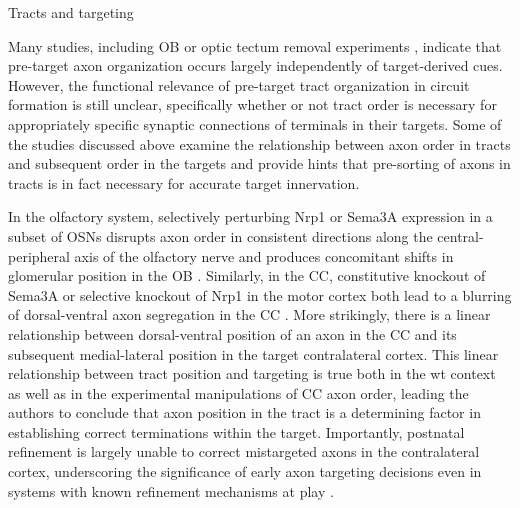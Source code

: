Tracts and targeting 

Many studies, including OB \cite{stjohn2003sorting} or optic tectum removal experiments \cite{reh1983organization}, indicate that pre-target axon organization occurs largely independently of target-derived cues.
However, the functional relevance of pre-target tract organization in circuit formation is still unclear, specifically whether or not tract order is necessary for appropriately specific synaptic connections of terminals in their targets.
Some of the studies discussed above examine the relationship between axon order in tracts and subsequent order in the targets and provide hints that pre-sorting of axons in tracts is in fact necessary for accurate target innervation. 

In the olfactory system, selectively perturbing Nrp1 or Sema3A expression in a subset of OSNs disrupts axon order in consistent directions along the central-peripheral axis of the olfactory nerve and produces concomitant shifts in glomerular position in the OB \cite{imai2009pre}. 
Similarly, in the CC, constitutive knockout of Sema3A or selective knockout of Nrp1 in the motor cortex both lead to a blurring of dorsal-ventral axon segregation in the CC \cite{zhou2013axon}. 
More strikingly, there is a linear relationship between dorsal-ventral position of an axon in the CC and its subsequent medial-lateral position in the target contralateral cortex. 
This linear relationship between tract position and targeting is true both in the wt context as well as in the experimental manipulations of CC axon order, leading the authors to conclude that axon position in the tract is a determining factor in establishing correct terminations within the target. 
Importantly, postnatal refinement is largely unable to correct mistargeted axons in the contralateral cortex, underscoring the significance of early axon targeting decisions even in systems with known refinement mechanisms at play \cite{zhou2013axon}.

